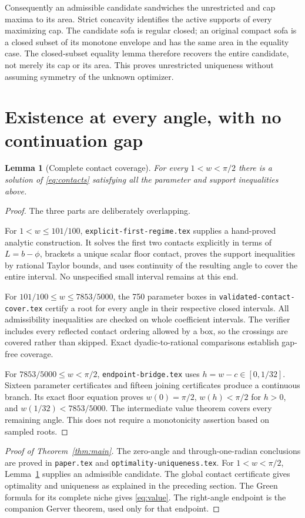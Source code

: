 \documentclass[11pt]{article}
\newtheorem{lemma}[theorem]{Lemma}
\theoremstyle{remark}\newtheorem{remark}[theorem]{Remark}
\begin{document}
Consequently an admissible candidate sandwiches the unrestricted and cap maxima to its area. Strict concavity identifies the active supports of every maximizing cap. The candidate sofa is regular closed; an original compact sofa is a closed subset of its monotone envelope and has the same area in the equality case. The closed-subset equality lemma therefore recovers the entire candidate, not merely its cap or its area. This proves unrestricted uniqueness without assuming symmetry of the unknown optimizer.

\section{Existence at every angle, with no continuation gap}
\begin{lemma}[Complete contact coverage]\label{lem:coverage}
For every $1<w<\pi/2$ there is a solution of \eqref{eq:contacts} satisfying all the parameter and support inequalities above.
\end{lemma}
\begin{proof}
The three parts are deliberately overlapping.

For $1<w\le101/100$, \texttt{explicit-first-regime.tex} supplies a hand-proved analytic construction. It solves the first two contacts explicitly in terms of $L=b-\phi$, brackets a unique scalar floor contact, proves the support inequalities by rational Taylor bounds, and uses continuity of the resulting angle to cover the entire interval. No unspecified small interval remains at this end.

For $101/100\le w\le7853/5000$, the 750 parameter boxes in \texttt{validated-contact-cover.tex} certify a root for every angle in their respective closed intervals. All admissibility inequalities are checked on whole coefficient intervals. The verifier includes every reflected contact ordering allowed by a box, so the crossings are covered rather than skipped. Exact dyadic-to-rational comparisons establish gap-free coverage.

For $7853/5000\le w<\pi/2$, \texttt{endpoint-bridge.tex} uses $h=w-c\in[0,1/32]$. Sixteen parameter certificates and fifteen joining certificates produce a continuous branch. Its exact floor equation proves $w(0)=\pi/2$, $w(h)<\pi/2$ for $h>0$, and $w(1/32)<7853/5000$. The intermediate value theorem covers every remaining angle. This does not require a monotonicity assertion based on sampled roots.
\end{proof}

\begin{proof}[Proof of Theorem~\ref{thm:main}]
The zero-angle and through-one-radian conclusions are proved in \texttt{paper.tex} and \texttt{optimality-uniqueness.tex}. For $1<w<\pi/2$, Lemma~\ref{lem:coverage} supplies an admissible candidate. The global contact certificate gives optimality and uniqueness as explained in the preceding section. The Green formula for its complete niche gives \eqref{eq:value}. The right-angle endpoint is the companion Gerver theorem, used only for that endpoint.
\end{proof}
\end{document}
